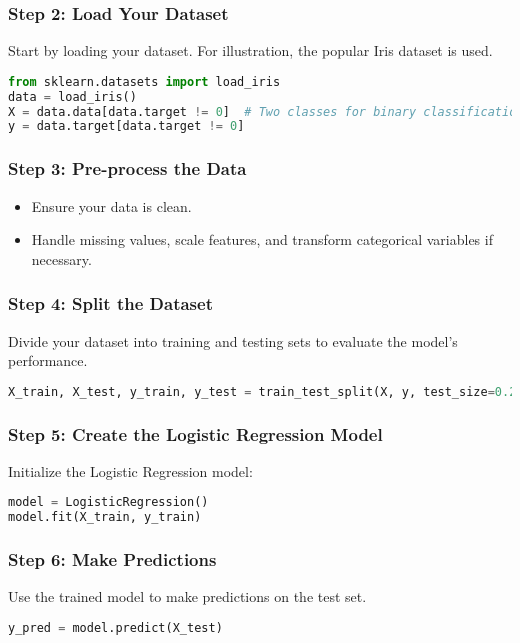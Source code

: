 \documentclass[aspectratio=169]{beamer}
\begin{document}
\begin{frame}[fragile]
    \frametitle{Step 2: Load Your Dataset}
    Start by loading your dataset. For illustration, the popular Iris dataset is used.
    \begin{lstlisting}[language=Python]
from sklearn.datasets import load_iris
data = load_iris()
X = data.data[data.target != 0]  # Two classes for binary classification
y = data.target[data.target != 0]
    \end{lstlisting}
\end{frame}

\begin{frame}[fragile]
    \frametitle{Step 3: Pre-process the Data}
    \begin{itemize}
        \item Ensure your data is clean.
        \item Handle missing values, scale features, and transform categorical variables if necessary.
    \end{itemize}
\end{frame}

\begin{frame}[fragile]
    \frametitle{Step 4: Split the Dataset}
    Divide your dataset into training and testing sets to evaluate the model's performance.
    \begin{lstlisting}[language=Python]
X_train, X_test, y_train, y_test = train_test_split(X, y, test_size=0.2, random_state=42)
    \end{lstlisting}
\end{frame}

\begin{frame}[fragile]
    \frametitle{Step 5: Create the Logistic Regression Model}
    Initialize the Logistic Regression model:
    \begin{lstlisting}[language=Python]
model = LogisticRegression()
model.fit(X_train, y_train)
    \end{lstlisting}
\end{frame}

\begin{frame}[fragile]
    \frametitle{Step 6: Make Predictions}
    Use the trained model to make predictions on the test set.
    \begin{lstlisting}[language=Python]
y_pred = model.predict(X_test)
    \end{lstlisting}
\end{frame}
\end{document}
